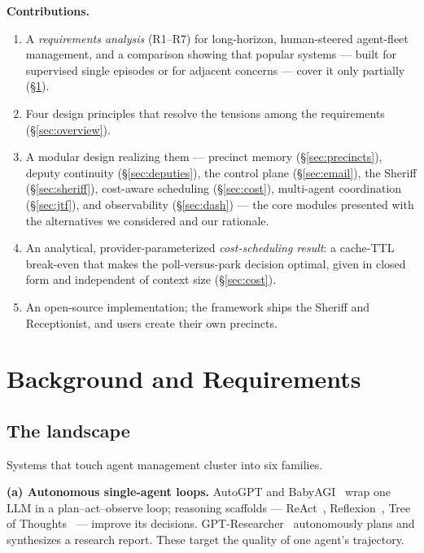 \documentclass[10pt,twocolumn]{article}
\begin{document}
\noindent\textbf{Contributions.}
\begin{enumerate}[leftmargin=1.3em,itemsep=1pt,topsep=2pt]
  \item A \emph{requirements analysis} (R1--R7) for long-horizon, human-steered
  agent-fleet management, and a comparison showing that popular systems --- built for
  supervised single episodes or for adjacent concerns --- cover it only partially
  (\S\ref{sec:bg}).
  \item Four design principles that resolve the tensions among the requirements
  (\S\ref{sec:overview}).
  \item A modular design realizing them --- precinct memory (\S\ref{sec:precincts}),
  deputy continuity (\S\ref{sec:deputies}), the control plane (\S\ref{sec:email}), the
  Sheriff (\S\ref{sec:sheriff}), cost-aware scheduling (\S\ref{sec:cost}), multi-agent
  coordination (\S\ref{sec:jtf}), and observability (\S\ref{sec:dash}) --- the core
  modules presented with the alternatives we considered and our rationale.
  \item An analytical, provider-parameterized \emph{cost-scheduling result}: a cache-TTL
  break-even that makes the poll-versus-park decision optimal, given in closed form and
  independent of context size (\S\ref{sec:cost}).
  \item An open-source implementation; the framework ships the Sheriff and Receptionist,
  and users create their own precincts.
\end{enumerate}

\section{Background and Requirements}
\label{sec:bg}

\subsection{The landscape}
Systems that touch agent management cluster into six families.

\noindent\textbf{(a) Autonomous single-agent loops.} AutoGPT and
BabyAGI~\cite{autogpt,babyagi} wrap one LLM in a plan--act--observe loop; reasoning
scaffolds --- ReAct~\cite{react}, Reflexion~\cite{reflexion}, Tree of
Thoughts~\cite{tot} --- improve its decisions. GPT-Researcher~\cite{gptresearcher}
autonomously plans and synthesizes a research report. These target the quality of one
agent's trajectory.
\end{document}
